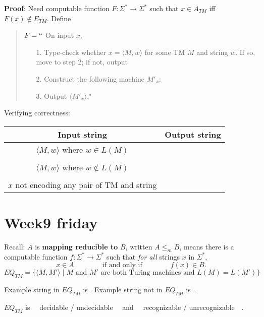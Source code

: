 \documentclass[12pt, oneside]{article}
\begin{document}
{\bf Proof}: Need computable function  $F: \Sigma^* \to \Sigma^*$  such that  $x \in A_{TM}$ iff $F(x)  \notin  E_{TM}$.
Define
\begin{quote}
$F =  ``$ On input $x$,
\begin{itemize}
\item[1.] Type-check whether  $x = \langle M, w \rangle$ for some TM $M$ and string $w$.   If so, move to step 2; if  not, output 
\item[2.] Construct the following machine $M'_x$:
\vspace{50pt}
\item[3.] Output $\langle M'_x \rangle$."
\end{itemize}
\end{quote}

Verifying correctness:
\begin{center}
\begin{tabular}{|c|c|}
\hline
Input string &  Output string \\
\hline
$\langle M, w \rangle$ where  $w \in L(M)$ & \phantom{\hspace{4in}} \\
& \\
$\langle M, w \rangle$ where $w \notin L(M)$ & \\
&\\
$x$ not encoding any pair of  TM and string   &  \\
\hline
\end{tabular}
\end{center}

\newpage \vfill
\section*{Week9 friday}


Recall:  $A$ is  {\bf  mapping  reducible to} $B$, written $A \leq_m B$,  means there is a computable function 
$f : \Sigma^* \to \Sigma^*$ such that {\it for all} strings  $x$ in $\Sigma^*$, 
\[
x  \in  A \qquad \qquad \text{if and  only  if} \qquad \qquad f(x) \in B.
\]
\[
EQ_{TM} = \{ \langle M, M' \rangle \mid \text{$M$ and $M'$ are both Turing machines and $L(M) =L(M')$} \}
\]

Example  string in  $EQ_{TM}$ is \underline{\phantom{\hspace{1.5in}}} .
Example  string not  in  $EQ_{TM}$ is \underline{\phantom{\hspace{1.5in}}} .

$EQ_{TM}$ is ~~decidable /  undecidable~~ and ~~recognizable /  unrecognizable~~.
\end{document}
